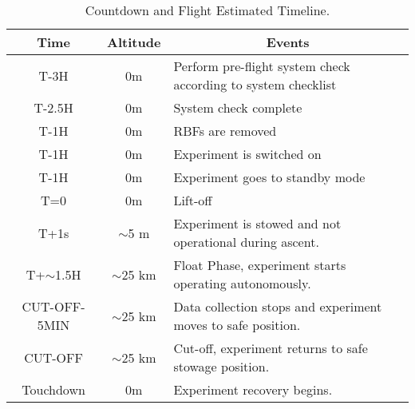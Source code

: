 \begin{table}[H]
\centering


\begin{tabular}{|l|l|l|}
\hline
\multicolumn{1}{|c|}{\textbf{Time}}       & \multicolumn{1}{c|}{\textbf{Altitude}}      & \multicolumn{1}{c|}{\textbf{Events}}                              \\ \hline
\multicolumn{1}{|c|}{T-3H}    & \multicolumn{1}{c|}{0m}             & Perform pre-flight system check according to system checklist                      \\ \hline           
\multicolumn{1}{|c|}{T-2.5H}    & \multicolumn{1}{c|}{0m}             & System check complete                    \\ \hline           
\multicolumn{1}{|c|}{T-1H}    & \multicolumn{1}{c|}{0m}             & RBFs are removed                     \\ \hline           
\multicolumn{1}{|c|}{T-1H}    & \multicolumn{1}{c|}{0m}             & Experiment is switched on                                \\ \hline
\multicolumn{1}{|c|}{T-1H}    & \multicolumn{1}{c|}{0m}             & Experiment goes to standby mode                          \\ \hline
\multicolumn{1}{|c|}{T=0}        & \multicolumn{1}{c|}{0m}             & Lift-off                                              \\ \hline
\multicolumn{1}{|c|}{T+1s}       & \multicolumn{1}{c|}{$\sim$5 m} & Experiment is stowed and not operational during ascent.                  \\ \hline
\multicolumn{1}{|c|}{T+$\sim$1.5H}                     & \multicolumn{1}{c|}{$\sim$25 km}                        & Float Phase, experiment starts operating autonomously.                                           \\ \hline
\multicolumn{1}{|c|}{CUT-OFF-5MIN}                     & \multicolumn{1}{c|}{$\sim$25 km}                        & Data collection stops and experiment moves to safe position.                                                \\ \hline
\multicolumn{1}{|c|}{CUT-OFF}                     & \multicolumn{1}{c|}{$\sim$25 km}                        & Cut-off, experiment returns to safe stowage position.                                                 \\ \hline
\multicolumn{1}{|c|}{Touchdown}                     &  \multicolumn{1}{c|}{0m}                        &  Experiment recovery begins.                \\ \hline
\end{tabular}
\caption{Countdown and Flight Estimated Timeline.}
\label{tab:countflight}
\end{table}
\raggedbottom
